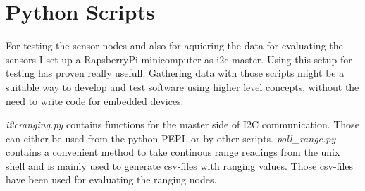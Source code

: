 
%
%

\section{Python Scripts}

For testing the sensor nodes and also for aquiering the data for evaluating the sensors I set up a RapsberryPi minicomputer as i2c master.
Using this setup for testing has proven really usefull.
Gathering data with those scripts might be a suitable way to develop and test software using higher level concepts, without the need to write code for embedded devices.

\emph{i2cranging.py} contains functions for the master side of I2C communication. Those can either be used from the python PEPL or by other scripts.
\emph{poll\_range.py} contains a convenient method to take continous range readings from the unix shell and is mainly used to generate csv-files with ranging values.
Those csv-files have been used for evaluating the ranging nodes.
